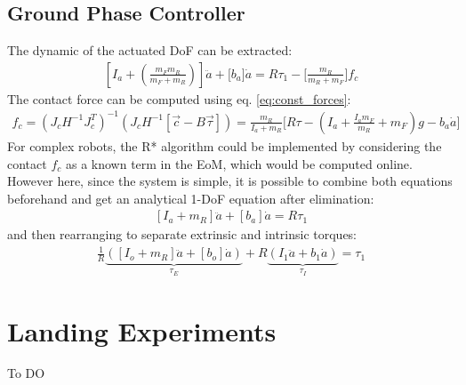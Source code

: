 \subsection{Ground Phase Controller}

The dynamic of the actuated DoF can be extracted:
%
\begin{align}
\left[ I_a + \left( \frac{m_F m_R}{m_F + m_R} \right) \right] \ddot{a} + \Bigg[ b_a \Bigg] \dot{a} = R \tau_1 - \Bigg[ \frac{m_R}{m_R+m_F} \Bigg] f_c
\end{align}
%
The contact force can be computed using eq. \eqref{eq:const_forces}:
%
\begin{align}
f_c = \left( J_c H^{-1} J_c^T \right)^{-1} \left(  J_c H^{-1} [\vec{c} - B \vec{\tau} ]  \right)
= \frac{m_R}{I_a+m_R} \Bigg[ R \tau - \left(I_a + \frac{I_a m_F}{m_R} + m_F \right) g - b_a \dot{a} \Bigg]
\end{align}
%
For complex robots, the R* algorithm could be implemented by considering the contact $f_c$ as a known term in the EoM, which would be computed online. However here, since the system is simple, it is possible to combine both equations beforehand and get an analytical 1-DoF equation after elimination:
%
\begin{align}
\left[ I_a + m_R \right] \ddot{a} + \left[ b_a \right] \dot{a} = R \tau_1 
\end{align}
%
and then rearranging to separate extrinsic and intrinsic torques:
%
\begin{align} 
\frac{1}{R}
\underbrace{\left(
\left[ I_o + m_R \right] \ddot{a} + \left[ b_o \right] \dot{a}
\right)}_{\tau_E}
+ R
\underbrace{\left(
 I_1 \ddot{a} + b_1 \dot{a}
\right)}_{\tau_I}
= \tau_1
\end{align}
%


\section{Landing Experiments}
\label{sec:case_exp}


To DO
